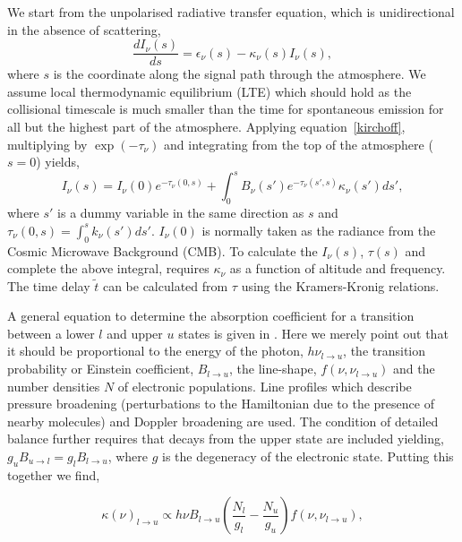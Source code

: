 We start from the unpolarised radiative transfer equation, which is unidirectional in the absence of scattering,
\begin{equation}\label{eq:rad_trans}
\frac{dI_\nu (s) }{ds} = \epsilon_\nu(s) -\kappa_\nu(s)  I_\nu (s),
\end{equation}
where $s$ is the coordinate along the signal path through the atmosphere. We assume local thermodynamic equilibrium (LTE) which should hold as the collisional timescale is much smaller than the time for spontaneous emission for all but the highest part of the atmosphere. Applying equation~\ref{kirchoff}, multiplying by $\exp(-\tau_\nu)$ and integrating from the top of the atmosphere ($s=0$) yields, 
\begin{equation}\label{eq:rad_trans2}
I_\nu(s) = I_\nu(0) e^{-\tau_\nu (0,s) }+ \int_0^s B_\nu(s')e^{-\tau_\nu (s',s) }\kappa_\nu(s')ds',
\end{equation}
where  $s'$ is a dummy variable in the same direction as $s$ and $\tau_\nu (0,s) = \int_0^{s} k_\nu(s')ds'$. $I_\nu(0)$ is normally taken as the radiance from the Cosmic Microwave Background (CMB).
To calculate the $I_\nu(s)$, $\tau(s)$ and complete the above integral, requires $\kappa_\nu$ as a function of altitude and frequency. The time delay $\tilde{t}$ can be calculated from $\tau$ using the Kramers-Kronig relations. 


A general equation to determine the absorption coefficient for a transition between a lower $l$ and upper $u$ states is given in \citet{Pardo_2001}. Here we merely point out that it should be proportional to the energy of the photon, $h\nu_{l \to u}$, the transition probability or Einstein coefficient, $ B_{l \to u}$, the line-shape, $f(\nu,\nu_{l \to u})$ and the number densities $N$ of electronic populations. Line profiles which describe pressure broadening (perturbations to the Hamiltonian due to the presence of nearby molecules) and Doppler broadening are used. The condition of detailed balance further requires that decays from the upper state are included yielding, $g_u B_{u \to l} =g_l B_{l \to u}$, where $g$ is the degeneracy of the electronic state. Putting this together we find,

\begin{equation}
\kappa(\nu) _{l \to u}  \propto  h\nu   B_{l \to u}  \left(\frac{N_l}{g_l}  -  \frac{N_u}{g_u} \right) f(\nu,\nu_{l \to u}),
\end{equation}

